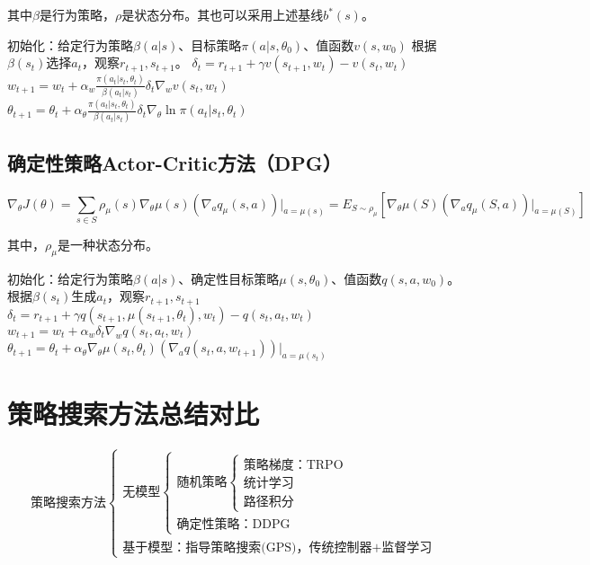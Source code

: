 \documentclass[
12pt, %
a4paper, 
oneside, %
headinclude,footinclude, %
]{scrartcl}
\begin{document}
其中$ \beta $是行为策略，$ \rho $是状态分布。其也可以采用上述基线$ b^*(s) $。
\begin{myalgorithm}
\State 初始化：给定行为策略$ \beta(a|s) $、目标策略$ \pi(a|s,\theta_0) $、值函数$ v(s,w_0) $
\State 根据$ \beta(s_t) $选择$ a_t $，观察$ r_{t + 1}, s_{t + 1} $。
\State $ \delta_t = r_{t + 1} + \gamma v(s_{t + 1}, w_t) - v(s_t, w_t) $ 
\State $ w_{t + 1} = w_t + \alpha_w \frac{\pi(a_t|s_t,\theta_t)}{\beta(a_t|s_t)} \delta_t \nabla_w v(s_t, w_t) $ 
\State $ \theta_{t + 1} = \theta_t + \alpha_\theta \frac{\pi(a_t|s_t,\theta_t)}{\beta(a_t|s_t)} \delta_t \nabla_\theta \ln \pi(a_t|s_t, \theta_t) $ 
\EndFor
\EndFor
\end{myalgorithm}
\subsection[确定性策略Actor-Critic方法]{确定性策略Actor-Critic方法（DPG）}
$$ \nabla_\theta J(\theta) = \sum_{s\in S} \rho_\mu(s)\nabla_\theta\mu(s)(\nabla_a q_\mu(s, a))\bigg|_{a=\mu(s)} = E_{S\sim\rho_\mu}[\nabla_\theta\mu(S)(\nabla_a q_\mu(S, a))\bigg|_{a=\mu(S)}] $$

其中，$ \rho_\mu $是一种状态分布。
\begin{myalgorithm}
\State 初始化：给定行为策略$ \beta(a|s) $、确定性目标策略$ \mu(s,\theta_0) $、值函数$ q(s,a,w_0) $。
\State 根据$ \beta(s_t) $生成$ a_t $，观察$ r_{t + 1}, s_{t + 1} $
\State $ \delta_t = r_{t+1} + \gamma q(s_{t+1}, \mu(s_{t+1},\theta_t), w_t) - q(s_t, a_t, w_t) $ 
\State $ w_{t + 1} = w_t + \alpha_w \delta_t \nabla_w q(s_t, a_t, w_t) $ 
\State $ \theta_{t + 1} = \theta_t + \alpha_\theta \nabla_\theta \mu(s_t, \theta_t) (\nabla_a q(s_t, a, w_{t + 1}))|_{a = \mu(s_t)} $ 
\EndFor
\EndFor
\end{myalgorithm}
\section{策略搜索方法总结对比}
$$
\text{策略搜索方法} \begin{cases} 
\text{无模型} \begin{cases} 
\text{随机策略} \begin{cases} 
\text{策略梯度：TRPO} \\ 
\text{统计学习} \\ 
\text{路径积分} 
\end{cases} \\ 
\text{确定性策略：DDPG}
\end{cases} \\ 
\text{基于模型：指导策略搜索(GPS)，传统控制器+监督学习}
\end{cases}
$$
\end{document}
